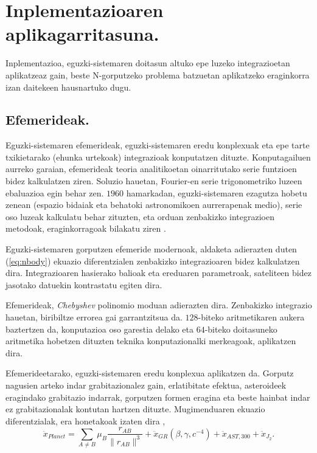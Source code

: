 \section{Inplementazioaren aplikagarritasuna.}


Inplementazioa, eguzki-sistemaren doitasun altuko epe luzeko integrazioetan aplikatzeaz gain, beste N-gorputzeko problema batzuetan aplikatzeko eraginkorra izan daitekeen hausnartuko dugu. 

\subsection*{Efemerideak.}

Eguzki-sistemaren  efemerideak, eguzki-sistemaren eredu konplexuak eta epe tarte txikietarako (ehunka urtekoak) integrazioak konputatzen dituzte. Konputagailuen aurreko garaian, efemerideak teoria analitikoetan oinarritutako serie funtzioen bidez kalkulatzen ziren. Soluzio hauetan, Fourier-en serie trigonometriko luzeen ebaluazioa egin behar zen. $1960$ hamarkadan, eguzki-sistemaren ezagutza hobetu zenean (espazio bidaiak eta behatoki astronomikoen aurrerapenak medio), serie oso luzeak kalkulatu behar zituzten, eta orduan zenbakizko integrazioen metodoak, eraginkorragoak bilakatu ziren \cite{Kaplan2015}.   
   
Eguzki-sistemaren gorputzen efemeride modernoak, aldaketa adierazten duten (\ref{eq:nbody})  ekuazio diferentzialen  zenbakizko integrazioaren bidez kalkulatzen dira. Integrazioaren hasierako balioak eta ereduaren parametroak, sateliteen bidez jasotako datuekin kontrastatu egiten dira.

Efemerideak, \emph{Chebyshev} polinomio moduan adierazten dira. Zenbakizko integrazio hauetan, biribiltze errorea gai garrantzitsua da. $128$-biteko aritmetikaren aukera baztertzen da, konputazioa oso garestia delako eta $64$-biteko doitasuneko aritmetika hobetzen dituzten teknika konputazionalki merkeagoak, aplikatzen dira. 

Efemerideetarako, eguzki-sistemaren eredu konplexua aplikatzen da. Gorputz nagusien arteko indar grabitazionalez gain, erlatibitate efektua, asteroideek eragindako grabitazio indarrak, gorputzen formen eragina eta beste hainbat indar ez grabitazionalak kontutan hartzen dituzte. Mugimenduaren ekuazio diferentzialak, era honetakoak izaten dira \cite{Feinga2015},      
      \begin{equation*}
      \ddot{x}_{Planet}= \sum_{A \neq B} \mu_B \frac{r_{AB}}{\|r_{AB}\|^3}+\ddot{x}_{GR} (\beta,\gamma,c^{-4})+ \ddot{x}_{AST,300}+ \ddot{x}_{J_2}.
      \end{equation*}


